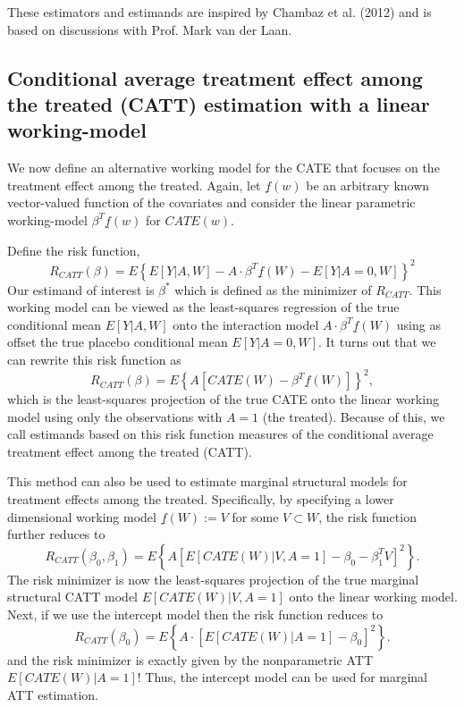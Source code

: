 \documentclass{article}
\begin{document}
\noindent  These estimators and estimands are inspired by Chambaz et al. (2012) and is based on discussions with Prof. Mark van der Laan.\nocite{ChambazLaanVarimp}

\subsection{Conditional average treatment effect among the treated (CATT) estimation with a linear working-model}

We now define an alternative working model for the CATE that focuses on the treatment effect among the treated. Again, let $\underline{f}(w)$ be an arbitrary known vector-valued function of the covariates and consider the linear parametric working-model $\beta^T \underline{f}(w)$ for $CATE(w)$.

\noindent Define the risk function,
$$R_{CATT}(\beta) = E \left\{E[Y|A,W] - A \cdot \beta^T \underline{f}(W) - E[Y|A=0,W]\right\}^2$$
Our estimand of interest is $\beta^*$ which is defined as the minimizer of $R_{CATT}$. This working model can be viewed as the least-squares regression of the true conditional mean $E[Y|A,W]$ onto the interaction model $A \cdot \beta^T \underline{f}(W) $ using as offset the true placebo conditional mean $E[Y|A=0,W]$. It turns out that we can rewrite this risk function as 
$$R_{CATT}(\beta) = E \left\{A \left[CATE(W) - \beta^T \underline{f}(W)  \right]  \right\}^2,$$
which is the least-squares projection of the true CATE onto the linear working model using only the observations with $A=1$ (the treated). Because of this, we call estimands based on this risk function measures of the conditional average treatment effect among the treated (CATT).

This method can also be used to estimate marginal structural models for treatment effects among the treated. Specifically, by specifying a lower dimensional working model $\underline{f}(W) := V$ for some $V \subset W$, the risk function further reduces to
$$R_{CATT}(\beta_0, \beta_1) = E \left\{A\left[E[CATE(W)|V,A=1] - \beta_0 - \beta_1^T V\right]^2 \right\}.$$
The risk minimizer is now the least-squares projection of the true marginal structural CATT model $E[CATE(W)|V, A=1]$ onto the linear working model. Next, if we use the intercept model then the risk function reduces to
$$R_{CATT}(\beta_0) = E \left\{ A\cdot \left[E[CATE(W)|A=1] - \beta_0 \right]^2 \right\}.$$
and the risk minimizer is exactly given by the nonparametric ATT $E[CATE(W)|A=1]$! Thus, the intercept model can be used for marginal ATT estimation.
\end{document}
